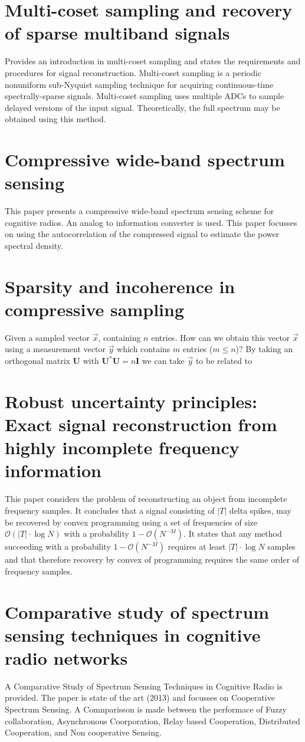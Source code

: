 \documentclass[report, oneside, a4paper, openany]{memoir}
\begin{document}
\section{Multi-coset sampling and recovery of sparse multiband signals \cite{lexa2011multi}}
Provides an introduction in multi-coset sampling and states the requirements and procedures for signal reconstruction. Multi-coset sampling is a periodic nonuniform sub-Nyquist sampling technique for acquiring continuous-time spectrally-sparse signals. Multi-coset sampling uses multiple ADCs to sample delayed versions of the input signal. Theoretically, the full spectrum may be obtained using this method.
\section{Compressive wide-band spectrum sensing \cite{polo2009compressive}}
%
This paper presents a compressive wide-band spectrum sensing scheme for cognitive radios. An analog to information converter is used. This paper focusses on using the autocorrelation of the compressed signal to estimate the power spectral density.
\section{Sparsity and incoherence in compressive sampling \cite{candes2007sparsity}}
%
Given a sampled vector $\vec{x}$, containing $n$ entries. How can we obtain this vector $\vec{x}$ using a measurement vector $\vec{y}$ which contains $m$ entries ($ m \leq n$)? 
By taking an orthogonal matrix $\mathbf{U}$ with $\mathbf{U}^{\ast}\mathbf{U} = n\mathbf{I}$ we can take $\vec{y}$ to be related to 
\section{Robust uncertainty principles: Exact signal reconstruction from highly incomplete frequency information \cite{candes2006robust}}
This paper considers the problem of reconstructing an object from incomplete frequency samples. It concludes that a signal consisting of $|T|$ delta spikes, may be recovered by convex programming using a set of frequencies of size $\mathcal{O}(|T|\cdot \log N)$ with a probability $1-\mathcal{O}(N^{-M})$. It states that any method succeeding with a probability $1-\mathcal{O}(N^{-M})$ requires at least $|T|\cdot \log N$ samples and that therefore recovery by convex of programming requires the same order of frequency samples.
\section{Comparative study of spectrum sensing techniques in cognitive radio networks \cite{khan2013comparative}}
%
A Comparative Study of Spectrum Sensing Techniques in Cognitive Radio is provided. The paper is state of the art (2013) and focusses on Cooperative Spectrum Sensing. A Comnparisson is made between the performace of Fuzzy collaboration, Asynchronous Coorporation, Relay based Cooperation, Distributed Cooperation, and Non cooperative Sensing.
\end{document}
